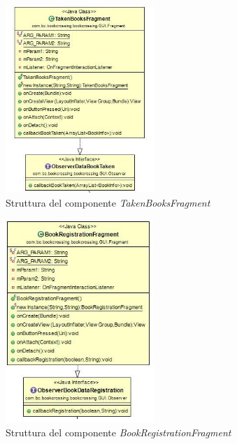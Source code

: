 \begin{figure}[h!]
	\includegraphics[width=0.5\textwidth]{Immagini/TakenBooksFragment}
	\caption{Struttura del componente \textit{TakenBooksFragment}}
	\label{fig:TakenBooksFragment}
\end{figure}

\begin{figure}[h!]
	\includegraphics[width=0.5\textwidth]{Immagini/BookRegistrationFragment}
	\caption{Struttura del componente \textit{BookRegistrationFragment}}
	\label{fig:BookRegistrationFragment}
\end{figure}
